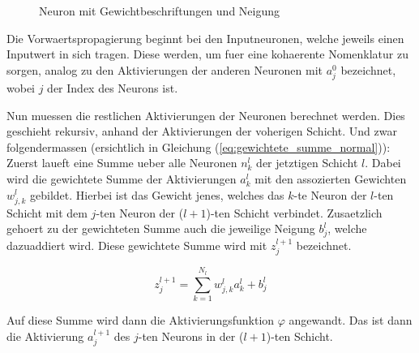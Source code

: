 \documentclass[../main]{subfiles}
\begin{document}
\begin{figure}[h!]

  \caption{Neuron mit Gewichtbeschriftungen und Neigung}
\end{figure}


\par\bigskip
Die Vorwaertspropagierung beginnt bei den Inputneuronen, welche jeweils
einen Inputwert in sich tragen. Diese werden, um fuer eine kohaerente Nomenklatur zu sorgen,
analog zu den Aktivierungen der anderen Neuronen mit $a_j^0$ bezeichnet, wobei
$j$ der Index des Neurons ist.\par
Nun muessen die restlichen Aktivierungen der Neuronen berechnet werden. Dies geschieht rekursiv, anhand der
Aktivierungen der voherigen Schicht. Und zwar folgendermassen (ersichtlich in
Gleichung (\ref{eq:gewichtete_summe_normal})): \\
Zuerst laueft eine Summe ueber alle Neuronen $n_k^{l}$ der jetztigen Schicht
$l$. Dabei wird die gewichtete Summe der Aktivierungen $a_k^{l}$ mit den
assozierten Gewichten $w_{j,k}^l$ gebildet. Hierbei ist das Gewicht jenes, welches das
$k$-te Neuron der $l$-ten Schicht mit dem $j$-ten Neuron der ($l+1$)-ten Schicht verbindet.
Zusaetzlich gehoert zu der gewichteten Summe auch die jeweilige Neigung $b_j^l$, welche
dazuaddiert wird. Diese gewichtete Summe wird mit $z_j^{l+1}$ bezeichnet.

\begin{equation}\label{eq:gewichtete_summe_normal}
  z_j^{l+1} = \sum_{k=1}^{N_l} w_{j,k}^l a_k^l + b_j^l
\end{equation}

Auf diese Summe wird dann die Aktivierungsfunktion $\varphi$ angewandt.
Das ist dann die Aktivierung $a_j^{l+1}$ des $j$-ten Neurons in der ($l+1$)-ten Schicht.
\end{document}
